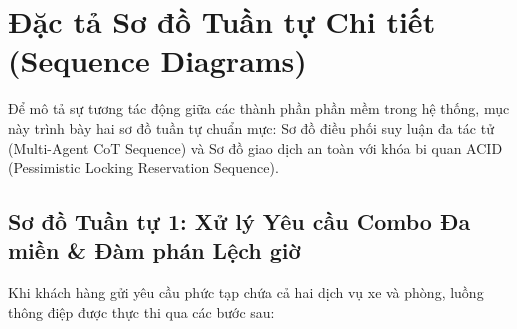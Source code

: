 \section{Đặc tả Sơ đồ Tuần tự Chi tiết (Sequence Diagrams)}
\label{sec:so_do_tuan_tu}

Để mô tả sự tương tác động giữa các thành phần phần mềm trong hệ thống, mục này trình bày hai sơ đồ tuần tự chuẩn mực: Sơ đồ điều phối suy luận đa tác tử (Multi-Agent CoT Sequence) và Sơ đồ giao dịch an toàn với khóa bi quan ACID (Pessimistic Locking Reservation Sequence).

\subsection{Sơ đồ Tuần tự 1: Xử lý Yêu cầu Combo Đa miền \& Đàm phán Lệch giờ}
\label{subsec:seq_multi_agent_cot}

Khi khách hàng gửi yêu cầu phức tạp chứa cả hai dịch vụ xe và phòng, luồng thông điệp được thực thi qua các bước sau:


